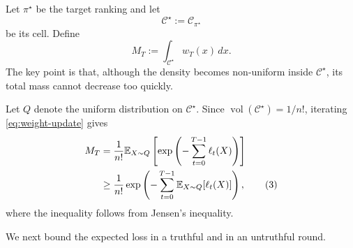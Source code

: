 \documentclass[11pt]{article}
\theoremstyle{definition}
\theoremstyle{remark}
\DeclareMathOperator{\vol}{vol}
\begin{document}
Let $\pi^\star$ be the target ranking and let
\[
    \mathcal C^\star:=\mathcal C_{\pi^\star}
\]
be its cell. Define
\[
    M_T:=\int_{\mathcal C^\star}w_T(x)\,dx.
\]
The key point is that, although the density becomes non-uniform inside
$\mathcal C^\star$, its total mass cannot decrease too quickly.

Let $Q$ denote the uniform distribution on $\mathcal C^\star$. Since
$\vol(\mathcal C^\star)=1/n!$, iterating
\eqref{eq:weight-update} gives
\begin{align}
    M_T
    &=
    \frac1{n!}
    \mathbb E_{X\sim Q}
    \left[
        \exp\left(
            -\sum_{t=0}^{T-1}\ell_t(X)
        \right)
    \right] \notag\\
    &\geq
    \frac1{n!}
    \exp\left(
        -\sum_{t=0}^{T-1}
        \mathbb E_{X\sim Q}[\ell_t(X)]
    \right),
    \tag{3}\label{eq:jensen-target}
\end{align}
where the inequality follows from Jensen's inequality.

We next bound the expected loss in a truthful and in an untruthful round.
\end{document}
